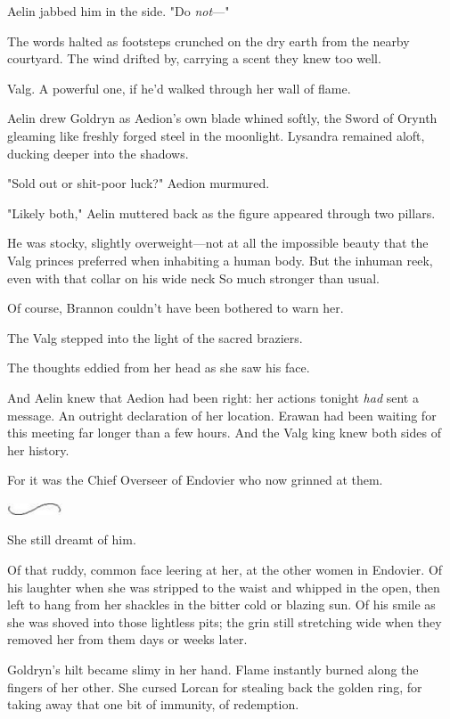 Aelin jabbed him in the side. "Do \emph{not}---"

The words halted as footsteps crunched on the dry earth from the nearby courtyard. The wind drifted by, carrying a scent they knew too well.

Valg. A powerful one, if he'd walked through her wall of flame.

Aelin drew Goldryn as Aedion's own blade whined softly, the Sword of Orynth gleaming like freshly forged steel in the moonlight. Lysandra remained aloft, ducking deeper into the shadows.

"Sold out or shit-poor luck?" Aedion murmured.

"Likely both," Aelin muttered back as the figure appeared through two pillars.

He was stocky, slightly overweight---not at all the impossible beauty that the Valg princes preferred when inhabiting a human body. But the inhuman reek, even with that collar on his wide neck  So much stronger than usual.

Of course, Brannon couldn't have been bothered to warn her.

The Valg stepped into the light of the sacred braziers.

The thoughts eddied from her head as she saw his face.

And Aelin knew that Aedion had been right: her actions tonight
\emph{had} sent a message. An outright declaration of her location. Erawan had been waiting for this meeting far longer than a few hours. And the Valg king knew both sides of her history.

For it was the Chief Overseer of Endovier who now grinned at them.

\includegraphics[width=0.65in,height=0.13in]{images/seperator}

She still dreamt of him.

Of that ruddy, common face leering at her, at the other women in Endovier. Of his laughter when she was stripped to the waist and whipped in the open, then left to hang from her shackles in the bitter cold or blazing sun. Of his smile as she was shoved into those lightless pits;
the grin still stretching wide when they removed her from them days or weeks later.

Goldryn's hilt became slimy in her hand. Flame instantly burned along the fingers of her other. She cursed Lorcan for stealing back the golden ring, for taking away that one bit of immunity, of redemption.

